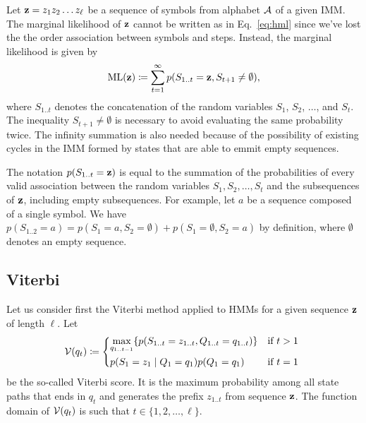 Let $\mathbf{z}=z_1z_2 \dots z_\ell$ be a sequence of symbols from alphabet $\mathcal{A}$ of a given IMM.\@
The marginal likelihood of $\mathbf{z}$ cannot be written as in Eq.~\eqref{eq:hml} since
we've lost the the order association between symbols and steps.
Instead, the marginal likelihood is given by
\begin{equation}\label{eq:ml}
  \mathrm{ML}(\mathbf{z}) \coloneqq \sum_{t=1}^{\infty} p(S_{1..t}=\mathbf{z}, S_{t+1}\neq \emptyset),
\end{equation}
where $S_{1..t}$ denotes the concatenation of the random variables $S_1$, $S_2$, $\dots$, and $S_t$.
The inequality $S_{t+1}\neq \emptyset$ is necessary to avoid evaluating the same probability twice.
The infinity summation is also needed because of the possibility of existing cycles in the IMM
formed by states that are able to emmit empty sequences.

\begin{remark}
  The notation $p(S_{1..t}=\mathbf{z})$ is equal to the summation of the probabilities of every valid
  association between the random variables $S_1, S_2, \dots, S_t$ and the subsequences of $\mathbf{z}$,
  including empty subsequences. For example, let $a$ be a sequence composed of a single symbol. We
  have $p(S_{1..2}=a) = p(S_1=a, S_2=\emptyset) + p(S_1=\emptyset, S_2=a)$ by definition, where
  $\emptyset$ denotes an empty sequence.
\end{remark}

\subsection{Viterbi}

Let us consider first the Viterbi method applied to HMMs for a given sequence $\mathbf{z}$ of length
$\ell$.
Let
\begin{equation*}
  \viterbi(q_t) \eqdef
  \begin{dcases*}
    \umax{q_{1..t-1}} \{ p(S_{1..t}=z_{1..t}, Q_{1..t}=q_{1..t}) \} & if $t>1$ \\
    p(S_1=z_1 \gv Q_1=q_1) p(Q_1=q_1)                               & if $t=1$
  \end{dcases*}
\end{equation*}
be the so-called Viterbi score. It is the maximum probability among all state paths that ends in
$q_t$ and generates the prefix $z_{1..t}$ from sequence $\mathbf{z}$.
The function domain of $\mathcal{V}(q_t)$ is such that $t \in \{1, 2, \dots, \ell\}$.

